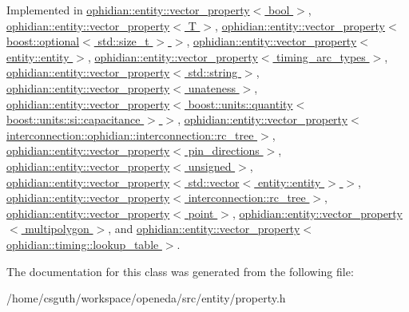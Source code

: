 Implemented in \hyperlink{classophidian_1_1entity_1_1vector__property_3_01bool_01_4_a3d61196d880589d68bf68d81c3310643}{ophidian\-::entity\-::vector\-\_\-property$<$ bool $>$}, \hyperlink{classophidian_1_1entity_1_1vector__property_a6b239378e987a33fd05c69bd57158bdc}{ophidian\-::entity\-::vector\-\_\-property$<$ T $>$}, \hyperlink{classophidian_1_1entity_1_1vector__property_a6b239378e987a33fd05c69bd57158bdc}{ophidian\-::entity\-::vector\-\_\-property$<$ boost\-::optional$<$ std\-::size\-\_\-t $>$ $>$}, \hyperlink{classophidian_1_1entity_1_1vector__property_a6b239378e987a33fd05c69bd57158bdc}{ophidian\-::entity\-::vector\-\_\-property$<$ entity\-::entity $>$}, \hyperlink{classophidian_1_1entity_1_1vector__property_a6b239378e987a33fd05c69bd57158bdc}{ophidian\-::entity\-::vector\-\_\-property$<$ timing\-\_\-arc\-\_\-types $>$}, \hyperlink{classophidian_1_1entity_1_1vector__property_a6b239378e987a33fd05c69bd57158bdc}{ophidian\-::entity\-::vector\-\_\-property$<$ std\-::string $>$}, \hyperlink{classophidian_1_1entity_1_1vector__property_a6b239378e987a33fd05c69bd57158bdc}{ophidian\-::entity\-::vector\-\_\-property$<$ unateness $>$}, \hyperlink{classophidian_1_1entity_1_1vector__property_a6b239378e987a33fd05c69bd57158bdc}{ophidian\-::entity\-::vector\-\_\-property$<$ boost\-::units\-::quantity$<$ boost\-::units\-::si\-::capacitance $>$ $>$}, \hyperlink{classophidian_1_1entity_1_1vector__property_a6b239378e987a33fd05c69bd57158bdc}{ophidian\-::entity\-::vector\-\_\-property$<$ interconnection\-::ophidian\-::interconnection\-::rc\-\_\-tree $>$}, \hyperlink{classophidian_1_1entity_1_1vector__property_a6b239378e987a33fd05c69bd57158bdc}{ophidian\-::entity\-::vector\-\_\-property$<$ pin\-\_\-directions $>$}, \hyperlink{classophidian_1_1entity_1_1vector__property_a6b239378e987a33fd05c69bd57158bdc}{ophidian\-::entity\-::vector\-\_\-property$<$ unsigned $>$}, \hyperlink{classophidian_1_1entity_1_1vector__property_a6b239378e987a33fd05c69bd57158bdc}{ophidian\-::entity\-::vector\-\_\-property$<$ std\-::vector$<$ entity\-::entity $>$ $>$}, \hyperlink{classophidian_1_1entity_1_1vector__property_a6b239378e987a33fd05c69bd57158bdc}{ophidian\-::entity\-::vector\-\_\-property$<$ interconnection\-::rc\-\_\-tree $>$}, \hyperlink{classophidian_1_1entity_1_1vector__property_a6b239378e987a33fd05c69bd57158bdc}{ophidian\-::entity\-::vector\-\_\-property$<$ point $>$}, \hyperlink{classophidian_1_1entity_1_1vector__property_a6b239378e987a33fd05c69bd57158bdc}{ophidian\-::entity\-::vector\-\_\-property$<$ multipolygon $>$}, and \hyperlink{classophidian_1_1entity_1_1vector__property_a6b239378e987a33fd05c69bd57158bdc}{ophidian\-::entity\-::vector\-\_\-property$<$ ophidian\-::timing\-::lookup\-\_\-table $>$}.



The documentation for this class was generated from the following file\-:\begin{DoxyCompactItemize}
\item 
/home/csguth/workspace/openeda/src/entity/property.\-h\end{DoxyCompactItemize}
